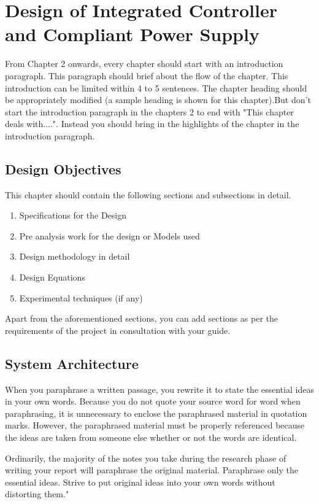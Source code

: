 \chapter{Design of Integrated Controller and Compliant Power Supply}

\indent\indent From Chapter 2 onwards, every chapter should start with an introduction paragraph. This paragraph should brief about the flow of the chapter. This introduction can be limited within 4 to 5 sentences. The chapter heading should be appropriately modified (a sample heading is shown for this chapter).But don't start the introduction paragraph in the chapters 2 to end with "This chapter deals with....". Instead you should bring in the highlights of the chapter in the introduction paragraph. 
\section{Design Objectives}
This chapter should contain the following sections and subsections in detail.
\begin{enumerate}
\item Specifications for the Design
\item Pre analysis work for the design or Models used
\item Design methodology in detail
\item Design Equations
\item Experimental techniques (if any)
\end{enumerate}
Apart from the aforementioned sections, you can add sections as per the requirements of the project in consultation with your guide.

\section{System Architecture}
When you paraphrase a written passage, you rewrite it to state the essential ideas in your own words. Because you do not quote your source word for word when paraphrasing, it is unnecessary to enclose the paraphrased material in quotation marks. However, the paraphrased material must be properly referenced because the ideas are taken from someone else whether or not the words are identical. 

Ordinarily, the majority of the notes you take during the research phase of writing your report will paraphrase the original material. Paraphrase only the essential ideas. Strive to put original ideas into your own words without distorting them."

